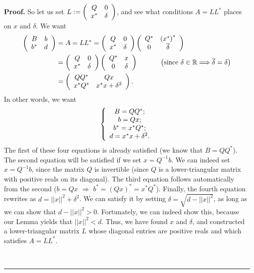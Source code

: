 \documentclass[numbers=enddot,12pt,final,onecolumn,notitlepage]{scrartcl}%
\numberwithin{exer}{subsection}
\theoremstyle{definition}
\newenvironment{proof}[1][Proof]{\noindent\textbf{#1.} }{\ \rule{0.5em}{0.5em}}
\begin{document}
\begin{proof}
So let us set $L:=\left(
\begin{array}
[c]{cc}%
Q & 0\\
x^{\ast} & \delta
\end{array}
\right)  $, and see what conditions $A=LL^{\ast}$ places on $x$ and $\delta$.
We want%
\begin{align*}
\left(
\begin{array}
[c]{cc}%
B & b\\
b^{\ast} & d
\end{array}
\right)    & =A=LL^{\ast}=\left(
\begin{array}
[c]{cc}%
Q & 0\\
x^{\ast} & \delta
\end{array}
\right)  \left(
\begin{array}
[c]{cc}%
Q^{\ast} & \left(  x^{\ast}\right)  ^{\ast}\\
0 & \overline{\delta}%
\end{array}
\right)  \\
& =\left(
\begin{array}
[c]{cc}%
Q & 0\\
x^{\ast} & \delta
\end{array}
\right)  \left(
\begin{array}
[c]{cc}%
Q^{\ast} & x\\
0 & \delta
\end{array}
\right)  \ \ \ \ \ \ \ \ \ \ \left(  \text{since }\delta\in\mathbb{R}%
\Longrightarrow\overline{\delta}=\delta\right)  \\
& =\left(
\begin{array}
[c]{cc}%
QQ^{\ast} & Qx\\
x^{\ast}Q^{\ast} & x^{\ast}x+\delta^{2}%
\end{array}
\right)  .
\end{align*}
In other words, we want%
\[
\left\{
\begin{array}
[c]{c}%
B=QQ^{\ast};\\
b=Qx;\\
b^{\ast}=x^{\ast}Q^{\ast};\\
d=x^{\ast}x+\delta^{2}.
\end{array}
\right.
\]
The first of these four equations is already satisfied (we know that
$B=QQ^{\ast}$). The second equation will be satisfied if we set $x=Q^{-1}b$.
We can indeed set $x=Q^{-1}b$, since the matrix $Q$ is invertible (since $Q$
is a lower-triangular matrix with positive reals on its diagonal). The third
equation follows automatically from the second ($b=Qx$ $\Longrightarrow$
$b^{\ast}=\left(  Qx\right)  ^{\ast}=x^{\ast}Q^{\ast}$). Finally, the fourth
equation rewrites as $d=\left\vert \left\vert x\right\vert \right\vert
^{2}+\delta^{2}$. We can satisfy it by setting $\delta=\sqrt{d-\left\vert
\left\vert x\right\vert \right\vert ^{2}}$, as long as we can show that
$d-\left\vert \left\vert x\right\vert \right\vert ^{2}>0$. Fortunately, we can
indeed show this, because our Lemma yields that $\left\vert \left\vert
x\right\vert \right\vert ^{2}<d$. Thus, we have found $x$ and $\delta$, and
constructed a lower-triangular matrix $L$ whose diagonal entries are positive
reals and which satisfies $A=LL^{\ast}$.


\end{proof}
\end{document}
